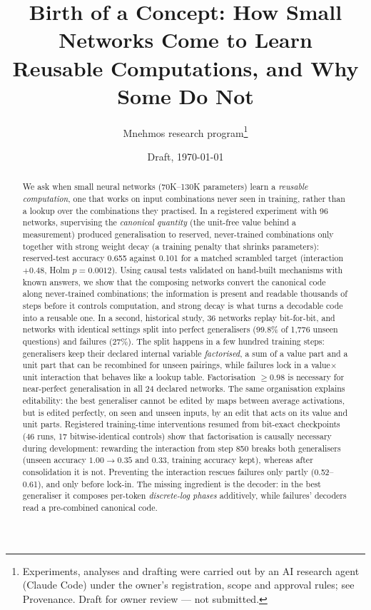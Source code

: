 \documentclass[11pt]{article}
\title{Birth of a Concept: How Small Networks Come to Learn\\Reusable Computations, and Why Some Do Not}
\author{Mnehmos research program\thanks{Experiments, analyses and drafting were carried out by an AI research agent
(Claude Code) under the owner's registration, scope and approval rules; see Provenance. Draft for owner review ---
not submitted.}}
\date{Draft, \today}
\begin{document}
\maketitle

\begin{abstract}
We ask when small neural networks (70K--130K parameters) learn a \emph{reusable computation}, one that works on
input combinations never seen in training, rather than a lookup over the combinations they practised. In a
registered experiment with 96 networks, supervising the \emph{canonical quantity} (the unit-free value behind a
measurement) produced generalisation to reserved, never-trained combinations only together with strong weight decay
(a training penalty that shrinks parameters): reserved-test accuracy 0.655 against 0.101 for a matched scrambled
target (interaction $+0.48$, Holm $p=0.0012$). Using causal tests validated on hand-built mechanisms with known
answers, we show that the composing networks convert the canonical code along never-trained combinations; the
information is present and readable thousands of steps before it controls computation, and strong decay is what
turns a decodable code into a reusable one. In a second, historical study, 36 networks replay bit-for-bit, and
networks with identical settings split into perfect generalisers (99.8\% of 1,776 unseen questions) and failures
(27\%). The split happens in a few hundred training steps: generalisers keep their declared internal variable
\emph{factorised}, a sum of a value part and a unit part that can be recombined for unseen pairings, while failures
lock in a value$\times$unit interaction that behaves like a lookup table. Factorisation $\ge 0.98$ is necessary for
near-perfect generalisation in all 24 declared networks. The same organisation explains editability: the best
generaliser cannot be edited by maps between average activations, but is edited perfectly, on seen and unseen
inputs, by an edit that acts on its value and unit parts. Registered training-time interventions resumed from
bit-exact checkpoints (46 runs, 17 bitwise-identical controls) show that factorisation is causally necessary during
development: rewarding the interaction from step 850 breaks both generalisers (unseen accuracy $1.00\to0.35$ and
$0.33$, training accuracy kept), whereas after consolidation it is not. Preventing the interaction rescues failures
only partly (0.52--0.61), and only before lock-in. The missing ingredient is the decoder: in the best generaliser it
composes per-token \emph{discrete-log phases} additively, while failures' decoders read a pre-combined canonical code.

\end{abstract}
\end{document}

